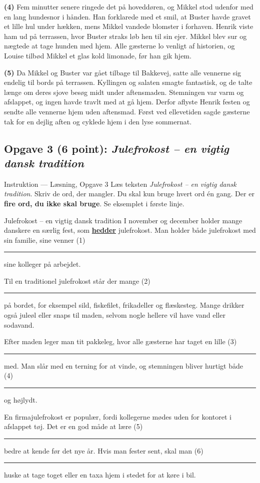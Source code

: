 \textbf{(4)} Fem minutter senere ringede det på hoveddøren, og Mikkel stod udenfor med en lang hundesnor i hånden. Han forklarede med et smil, at Buster havde gravet et lille hul under hækken, mens Mikkel vandede blomster i forhaven. Henrik viste ham ud på terrassen, hvor Buster straks løb hen til sin ejer. Mikkel blev sur og nægtede at tage hunden med hjem. Alle gæsterne lo venligt af historien, og Louise tilbød Mikkel et glas kold limonade, før han gik hjem.

\textbf{(5)} Da Mikkel og Buster var gået tilbage til Bakkevej, satte alle vennerne sig endelig til bords på terrassen. Kyllingen og salaten smagte fantastisk, og de talte længe om deres sjove besøg midt under aftensmaden. Stemningen var varm og afslappet, og ingen havde travlt med at gå hjem. Derfor aflyste Henrik festen og sendte alle vennerne hjem uden aftensmad. Først ved ellevetiden sagde gæsterne tak for en dejlig aften og cyklede hjem i den lyse sommernat.

\subsection*{Opgave 3 (6 point): \textit{Julefrokost -- en vigtig dansk tradition}}

\begin{grammatikbox}{Instruktion — Læsning, Opgave 3}
\small
Læs teksten \textit{Julefrokost -- en vigtig dansk tradition}. Skriv de ord, der mangler. Du skal kun bruge hvert ord én gang. Der er \textbf{fire ord, du ikke skal bruge}. Se eksemplet i første linje.
\end{grammatikbox}

\begin{emailbox}{Julefrokost -- en vigtig dansk tradition}
I november og december holder mange danskere en særlig fest, som \underline{\textbf{hedder}} julefrokost. Man holder både julefrokost med sin familie, sine venner (1)\ \rule{2.1cm}{0.4pt} sine kolleger på arbejdet.

\vspace{0.3em}
Til en traditionel julefrokost står der mange (2)\ \rule{2.1cm}{0.4pt} på bordet, for eksempel sild, fiskefilet, frikadeller og flæskesteg. Mange drikker også juleøl eller snaps til maden, selvom nogle hellere vil have vand eller sodavand.

\vspace{0.3em}
Efter maden leger man tit pakkeleg, hvor alle gæsterne har taget en lille (3)\ \rule{2.1cm}{0.4pt} med. Man slår med en terning for at vinde, og stemningen bliver hurtigt både (4)\ \rule{2.1cm}{0.4pt} og højlydt.

\vspace{0.3em}
En firmajulefrokost er populær, fordi kollegerne mødes uden for kontoret i afslappet tøj. Det er en god måde at lære (5)\ \rule{2.1cm}{0.4pt} bedre at kende før det nye år. Hvis man fester sent, skal man (6)\ \rule{2.1cm}{0.4pt} huske at tage toget eller en taxa hjem i stedet for at køre i bil.
\end{emailbox}

